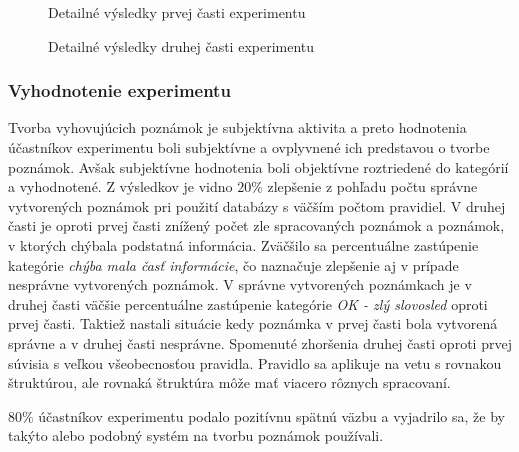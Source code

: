 \begin{figure}[H]%
	\centering
	\qquad
	\caption{Detailné výsledky prvej časti experimentu}%
	\label{experiments:user_experiment:results:fig:exp_detailed_comparison_first}%
\end{figure}


\begin{figure}[H]%
	\centering
	\qquad
	\caption{Detailné výsledky druhej časti experimentu}%
	\label{experiments:user_experiment:results:fig:exp_detailed_comparison_second}%
\end{figure}

\subsubsection{Vyhodnotenie experimentu}
Tvorba vyhovujúcich poznámok je subjektívna aktivita a preto hodnotenia účastníkov experimentu boli subjektívne a ovplyvnené ich predstavou o tvorbe poznámok. Avšak subjektívne hodnotenia boli objektívne roztriedené do kategórií a vyhodnotené. Z výsledkov je vidno $20\%$ zlepšenie z pohľadu počtu správne vytvorených poznámok pri použití databázy s väčším počtom pravidiel. V druhej časti je oproti prvej časti znížený počet zle spracovaných poznámok a poznámok, v ktorých chýbala podstatná informácia. Zväčšilo sa percentuálne zastúpenie kategórie \textit{chýba mala časť informácie}, čo naznačuje zlepšenie aj v prípade nesprávne vytvorených poznámok. V správne vytvorených poznámkach je v druhej časti väčšie percentuálne zastúpenie kategórie \textit{OK - zlý slovosled} oproti prvej časti. Taktiež nastali situácie kedy poznámka v prvej časti bola vytvorená správne a v druhej časti nesprávne. Spomenuté zhoršenia druhej časti oproti prvej súvisia s veľkou všeobecnosťou pravidla. Pravidlo sa aplikuje na vetu s rovnakou štruktúrou, ale rovnaká štruktúra môže mať viacero rôznych spracovaní.

$80\%$ účastníkov experimentu podalo pozitívnu spätnú väzbu a vyjadrilo sa, že by takýto alebo podobný systém na tvorbu poznámok používali.

